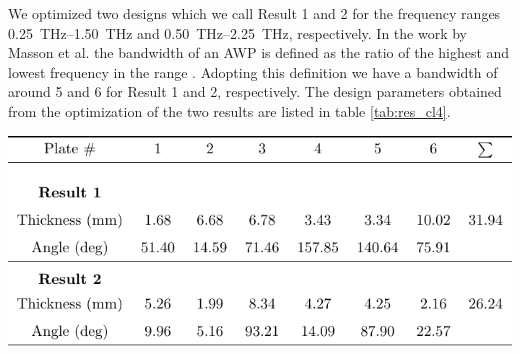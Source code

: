 We optimized two designs which we call Result 1 and 2 for the frequency ranges \SIrange[range-phrase=-, range-units=single]{0.25}{1.50}{\tera \hertz} and \SIrange[range-phrase=-, range-units=single]{0.50}{2.25}{\tera \hertz}, respectively. In the work by Masson et al. the bandwidth of an AWP is defined as the ratio of the highest and lowest frequency in the range \cite{Masson2006}. Adopting this definition we have a bandwidth of around 5 and 6 for Result 1 and 2, respectively. The design parameters obtained from the optimization of the two results are listed in table \ref{tab:res_cl4}. 

\begin{table}[ht]
    \centering
    \includegraphics[scale=1.0]{images/results/ceramic_result_table.pdf}
    \caption{Design parameters for Result 1 and 2. Both results are obtained through the optimization of $L_{\lambda/4}$ for $n=6$. In the case of Result 1 the frequency range for the optimization was limited to \SIrange[range-phrase=-, range-units=single]{0.25}{1.50}{\tera \hertz} while for Result 2 the range was set to \SIrange[range-phrase=-, range-units=single]{0.50}{2.25}{\tera \hertz}.}
    \label{tab:res_cl4}
\end{table}


